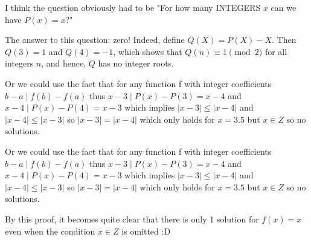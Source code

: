 \begin{solution}
	I think the question obviously had to be "For how many INTEGERS $x$ can we have $P(x) = x$?"

The answer to this question: zero! Indeed, define $Q(X) = P(X) - X$. Then $Q(3) = 1$ and $Q(4) = -1$, which shows that $Q(n) \equiv 1\pmod{2}$ for all integers $n$, and hence, $Q$ has no integer roots.
\end{solution}



\begin{solution}
	Or we could use the fact that for any function f with integer coefficients $b-a \mid f(b)-f(a)$ thus $x-3\mid P(x)-P(3)=x-4$ and $x-4 \mid P(x)-P(4)=x-3$ which implies $|x-3| \leq |x-4|$ and $|x-4| \leq |x-3|$ so $|x-3|=|x-4|$ which only holds for $x=3.5$ but $x \in Z$ so no solutions.
\end{solution}



\begin{solution}
	\begin{tcolorbox}Or we could use the fact that for any function f with integer coefficients $b-a \mid f(b)-f(a)$ thus $x-3\mid P(x)-P(3)=x-4$ and $x-4 \mid P(x)-P(4)=x-3$ which implies $|x-3| \leq |x-4|$ and $|x-4| \leq |x-3|$ so $|x-3|=|x-4|$ which only holds for $x=3.5$ but $x \in Z$ so no solutions.\end{tcolorbox}

By this proof, it becomes quite clear that there is only 1 solution for $f(x)=x$ even when the condition $x \in Z$ is omitted :D  
\end{solution}






